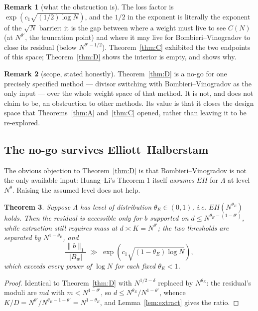 \documentclass[11pt,a4paper]{article}
\theoremstyle{plain}
\newtheorem{theorem}{Theorem}
\theoremstyle{definition}
\newtheorem{remark}[theorem]{Remark}
\begin{document}
\begin{remark}[what the obstruction is]
The loss factor is $\exp(c_1\sqrt{(1/2)\log N})$, and the $1/2$ in the
exponent is literally the exponent of the $\sqrt N$ barrier: it is the
gap between where a weight must live to see $C(N)$ (at $N^{\theta'}$,
the truncation point) and where it may live for Bombieri--Vinogradov
to close its residual (below $N^{\theta'-1/2}$). Theorem~\ref{thm:C}
exhibited the two endpoints of this space; Theorem~\ref{thm:D} shows
the interior is empty, and shows why.
\end{remark}

\begin{remark}[scope, stated honestly]
Theorem~\ref{thm:D} is a no-go for one precisely specified method ---
divisor switching with Bombieri--Vinogradov as the only input --- over
the whole weight space of that method. It is not, and does not claim
to be, an obstruction to other methods. Its value is that it closes
the design space that Theorems~\ref{thm:A} and~\ref{thm:C} opened,
rather than leaving it to be re-explored.
\end{remark}

\subsection{The no-go survives Elliott--Halberstam}

The obvious objection to Theorem~\ref{thm:D} is that
Bombieri--Vinogradov is not the only available input: Huang--Li's
Theorem 1 itself \emph{assumes} $EH$ for $\Lambda$ at level
$N^{\theta}$. Raising the assumed level does not help.

\begin{theorem}\label{thm:Dprime}
Suppose $\Lambda$ has level of distribution $\theta_E \in (0,1)$, i.e.
$EH(N^{\theta_E})$ holds. Then the residual is accessible only for $b$
supported on $d \le N^{\theta_E-(1-\theta')}$, while extraction still
requires mass at $d \asymp K = N^{\theta'}$; the two thresholds are
separated by $N^{1-\theta_E}$, and
\[
  \frac{\|b\|_1}{|B_w|} \;\gg\;
  \exp\!\left(c_1\sqrt{(1-\theta_E)\log N}\right),
\]
which exceeds every power of $\log N$ for each fixed $\theta_E<1$.
\end{theorem}

\begin{proof}
Identical to Theorem~\ref{thm:D} with $N^{1/2-\delta}$ replaced by
$N^{\theta_E}$: the residual's moduli are $md$ with $m<N^{1-\theta'}$,
so $d \le N^{\theta_E}/N^{1-\theta'}$, whence
$K/D = N^{\theta'}/N^{\theta_E-1+\theta'} = N^{1-\theta_E}$, and
Lemma~\ref{lem:extract} gives the ratio.
\end{proof}
\end{document}
